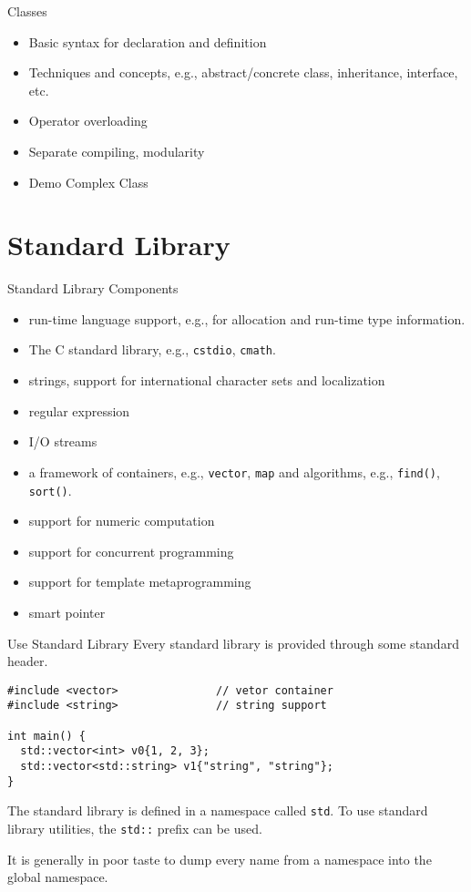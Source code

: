 \documentclass[presentation]{beamer}
\begin{document}
\begin{frame}[label={sec:orgheadline58}]{Classes}
\begin{itemize}
\item Basic syntax for declaration and definition
\item Techniques and concepts, e.g., abstract/concrete class,
inheritance, interface, etc.
\item Operator overloading
\item Separate compiling, modularity

\item Demo Complex Class
\end{itemize}
\end{frame}

\section{Standard Library}
\label{sec:orgheadline80}

\begin{frame}[fragile,label={sec:orgheadline60}]{Standard Library Components}
 \begin{itemize}
\item run-time language support, e.g., for allocation and run-time type
information.
\item The C standard library, e.g., \texttt{cstdio}, \texttt{cmath}.
\item strings, support for international character sets and
localization
\item regular expression
\item I/O streams
\item a framework of containers, e.g., \texttt{vector}, \texttt{map} and algorithms,
e.g., \texttt{find()}, \texttt{sort()}.
\item support for numeric computation
\item support for concurrent programming
\item support for template metaprogramming
\item smart pointer
\end{itemize}
\end{frame}

\begin{frame}[fragile,label={sec:orgheadline61}]{Use Standard Library}
 Every standard library is provided through some standard header.

\begin{verbatim}
#include <vector>               // vetor container
#include <string>               // string support

int main() {
  std::vector<int> v0{1, 2, 3};
  std::vector<std::string> v1{"string", "string"};
}
\end{verbatim}

The standard library is defined in a namespace called \texttt{std}.  To
use standard library utilities, the \texttt{std::} prefix can be used.

It is generally in poor taste to dump every name from a namespace
into the global namespace.
\end{frame}
\end{document}
